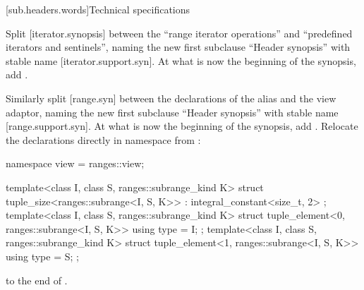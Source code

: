 [sub.headers.words]{Technical specifications}

Split [iterator.synopsis] between the ``range iterator operations'' and
``predefined iterators and sentinels'', naming the new first subclause
``Header  synopsis'' with stable name
[iterator.support.syn]. At what is now the beginning of the 
synopsis, add .

Similarly split [range.syn] between the declarations of the 
alias and the  view adaptor, naming the new first subclause
``Header  synopsis'' with stable name
[range.support.syn]. At what is now the beginning of the 
synopsis, add . Relocate the declarations
directly in namespace  from :
\begin{codeblock}
  namespace view = ranges::view;

  template<class I, class S, ranges::subrange_kind K>
  struct tuple_size<ranges::subrange<I, S, K>>
    : integral_constant<size_t, 2> {};
  template<class I, class S, ranges::subrange_kind K>
  struct tuple_element<0, ranges::subrange<I, S, K>> {
    using type = I;
  };
  template<class I, class S, ranges::subrange_kind K>
  struct tuple_element<1, ranges::subrange<I, S, K>> {
    using type = S;
  };
\end{codeblock}
to the end of .

